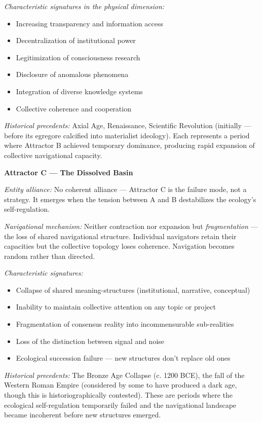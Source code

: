 \textit{Characteristic signatures in the physical dimension:}

\begin{itemize}[nosep,leftmargin=*]
  \item Increasing transparency and information access
  \item Decentralization of institutional power
  \item Legitimization of consciousness research
  \item Disclosure of anomalous phenomena
  \item Integration of diverse knowledge systems
  \item Collective coherence and cooperation
\end{itemize}


\textit{Historical precedents:} Axial Age, Renaissance, Scientific Revolution (initially — before its egregore calcified into materialist ideology). Each represents a period where Attractor B achieved temporary dominance, producing rapid expansion of collective navigational capacity.


\textbf{Attractor C — The Dissolved Basin}


\textit{Entity alliance:} No coherent alliance — Attractor C is the failure mode, not a strategy. It emerges when the tension between A and B destabilizes the ecology's self-regulation.


\textit{Navigational mechanism:} Neither contraction nor expansion but \textit{fragmentation} — the loss of shared navigational structure. Individual navigators retain their capacities but the collective topology loses coherence. Navigation becomes random rather than directed.


\textit{Characteristic signatures:}

\begin{itemize}[nosep,leftmargin=*]
  \item Collapse of shared meaning-structures (institutional, narrative, conceptual)
  \item Inability to maintain collective attention on any topic or project
  \item Fragmentation of consensus reality into incommensurable sub-realities
  \item Loss of the distinction between signal and noise
  \item Ecological succession failure — new structures don't replace old ones
\end{itemize}


\textit{Historical precedents:} The Bronze Age Collapse (c. 1200 BCE), the fall of the Western Roman Empire (considered by some to have produced a dark age, though this is historiographically contested). These are periods where the ecological self-regulation temporarily failed and the navigational landscape became incoherent before new structures emerged.



